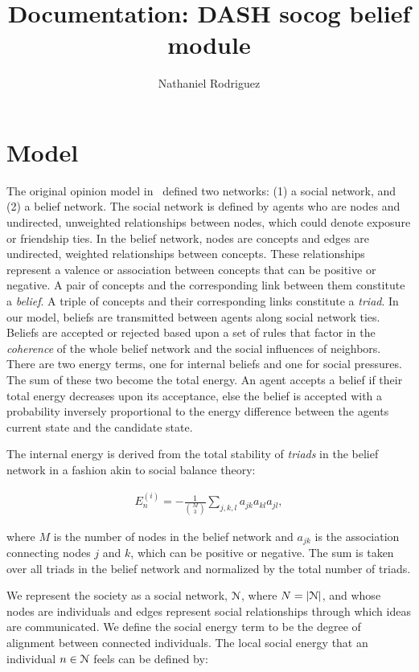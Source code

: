 \documentclass[11pt, a4paper]{article}
\begin{document}
\title{Documentation: DASH socog belief module}
\author{Nathaniel Rodriguez}
\date{}
\maketitle

\section{Model}

The original opinion model in~\cite{cogsocial} defined two networks: (1) a social network, and (2) a belief network. The social network is defined by agents who are nodes and undirected, unweighted relationships between nodes, which could denote exposure or friendship ties. In the belief network, nodes are concepts and edges are undirected, weighted relationships between concepts. These relationships represent a valence or association between concepts that can be positive or negative. A pair of concepts and the corresponding link between them constitute a \emph{belief}. A triple of concepts and their corresponding links constitute a \emph{triad}. In our model, beliefs are transmitted between agents along social network ties. Beliefs are accepted or rejected based upon a set of rules that factor in the \emph{coherence} of the whole belief network and the social influences of neighbors. There are two energy terms, one for internal beliefs and one for social pressures. The sum of these two become the total energy. An agent accepts a belief if their total energy decreases upon its acceptance, else the belief is accepted with a probability inversely proportional to the energy difference between the agents current state and the candidate state.

The internal energy is derived from the total stability of \emph{triads} in the belief network in a fashion akin to social balance theory:

\begin{eqnarray}\label{eq:indive}
E_n^{(i)} = -\frac{1}{\binom{M}{3}} \sum_{j,k,l} a_{jk} a_{kl} a_{jl}, 
\end{eqnarray}

where $M$ is the number of nodes in the belief network and $a_{jk}$ is the association connecting nodes $j$ and $k$, which can be positive or negative.  
The sum is taken over all triads in the belief network and normalized by the total number of triads.

We represent the society as a social network, $\EuScript{N}$, where $N=|\EuScript{N}|$, and 
whose nodes are individuals and edges represent social
relationships through which ideas are communicated.  We define the social energy term to be the degree of alignment between connected individuals. The local social energy that an individual $n\in \EuScript{N}$ feels can be defined by:
\end{document}
